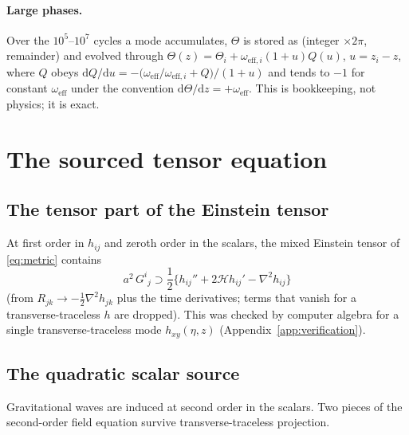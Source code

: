 \documentclass[11pt,a4paper]{article}
\newcommand{\cH}{\mathcal{H}}
\newcommand{\dd}{\mathrm{d}}
\newcommand{\om}{\omega_{\mathrm{eff}}}
\theoremstyle{remark}
\begin{document}
\paragraph{Large phases.} Over the $10^5$--$10^7$ cycles a mode accumulates, $\Theta$ is stored as (integer $\times2\pi$, remainder) and evolved through $\Theta(z) = \Theta_i + \omega_{\mathrm{eff},i}(1+u)Q(u)$, $u = z_i - z$, where $Q$ obeys $\dd Q/\dd u = -\big(\om/\omega_{\mathrm{eff},i} + Q\big)/(1+u)$ and tends to $-1$ for constant $\om$ under the convention $\dd\Theta/\dd z = +\om$. This is bookkeeping, not physics; it is exact.

\section{The sourced tensor equation}
\label{sec:tensor}

\subsection{The tensor part of the Einstein tensor}
\label{sec:tensor-lhs}

At first order in $h_{ij}$ and zeroth order in the scalars, the mixed Einstein tensor of \eqref{eq:metric} contains
\begin{equation}
a^2\,G^i{}_j\supset\frac12\Big\{h_{ij}'' + 2\cH h_{ij}' - \nabla^2h_{ij}\Big\}
\label{eq:tensor-lhs}
\end{equation}
(from $R_{jk}\to-\tfrac12\nabla^2h_{jk}$ plus the time derivatives; terms that vanish for a transverse-traceless $h$ are dropped). This was checked by computer algebra for a single transverse-traceless mode $h_{xy}(\eta,z)$ (Appendix~\ref{app:verification}).

\subsection{The quadratic scalar source}
\label{sec:tensor-source}

Gravitational waves are induced at second order in the scalars. Two pieces of the second-order field equation survive transverse-traceless projection.
\end{document}
